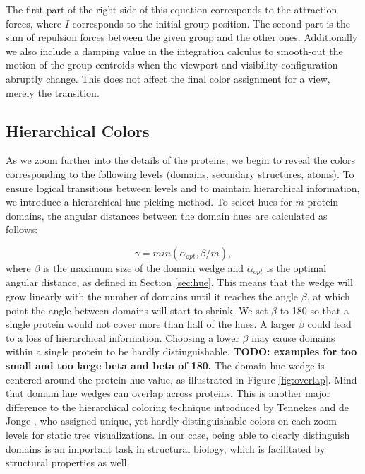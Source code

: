 \documentclass{egpubl}
\begin{document}
	The first part of the right side of this equation corresponds to the attraction forces, where $I$ corresponds to the initial group position.
	The second part is the sum of repulsion forces between the given group and the other ones.
    Additionally we also include a damping value in the integration calculus to smooth-out the motion of the group centroids when the viewport and visibility configuration abruptly change. This does not affect the final color assignment for a view, merely the transition.
	
	\subsection{Hierarchical Colors}
	\label{sec:hierarchy}
	
	
	
	As we zoom further into the details of the proteins, we begin to reveal the colors corresponding to the following levels (domains, secondary structures, atoms). 
	To ensure logical transitions between levels and to maintain hierarchical information, we introduce a hierarchical hue picking method. 
	To select hues for $m$ protein domains, the angular distances between the domain hues are calculated as follows: 
	
	\[
	\gamma = min(\alpha_{opt}, \beta / m),
	\]
	where $\beta$ is the maximum size of the domain wedge and $\alpha_{opt}$ is the optimal angular distance, as defined in Section \ref{sec:hue}.
	This means that the wedge will grow linearly with the number of domains until it reaches the angle $\beta$, at which point the angle between domains will start to shrink. 
	We set $\beta$ to 180 so that a single protein would not cover more than half of the hues. 
	A larger $\beta$ could lead to a loss of hierarchical information. 
	Choosing a lower $\beta$ may cause domains within a single protein to be hardly distinguishable.  
	\textbf{TODO: examples for too small and too large beta and beta of 180. }
	The domain hue wedge is centered around the protein hue value, as illustrated in Figure \ref{fig:overlap}.
	Mind that domain hue wedges can overlap across proteins. 
	This is another major difference to the hierarchical coloring technique introduced by Tennekes and de Jonge \cite{tennekes2014tree}, who assigned unique, yet hardly distinguishable colors on each zoom levels for static tree visualizations. 
	In our case, being able to clearly distinguish domains is an important task in structural biology, which is facilitated by structural properties as well. 
	
\end{document}
